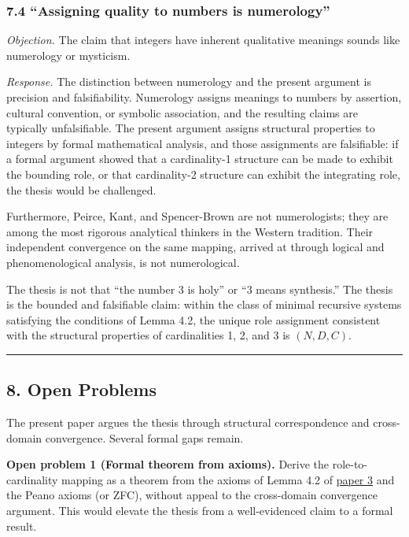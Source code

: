 \documentclass[
  11pt,
  letterpaper,
]{article}
\begin{document}
\subsubsection{7.4 ``Assigning quality to numbers is
numerology''}\label{assigning-quality-to-numbers-is-numerology}

\emph{Objection.} The claim that integers have inherent qualitative
meanings sounds like numerology or mysticism.

\emph{Response.} The distinction between numerology and the present
argument is precision and falsifiability. Numerology assigns meanings to
numbers by assertion, cultural convention, or symbolic association, and
the resulting claims are typically unfalsifiable. The present argument
assigns structural properties to integers by formal mathematical
analysis, and those assignments are falsifiable: if a formal argument
showed that a cardinality-1 structure can be made to exhibit the
bounding role, or that cardinality-2 structure can exhibit the
integrating role, the thesis would be challenged.

Furthermore, Peirce, Kant, and Spencer-Brown are not numerologists; they
are among the most rigorous analytical thinkers in the Western
tradition. Their independent convergence on the same mapping, arrived at
through logical and phenomenological analysis, is not numerological.

The thesis is not that ``the number 3 is holy'' or ``3 means
synthesis.'' The thesis is the bounded and falsifiable claim: within the
class of minimal recursive systems satisfying the conditions of Lemma
4.2, the unique role assignment consistent with the structural
properties of cardinalities 1, 2, and 3 is \((N, D, C)\).

\begin{center}\rule{0.5\linewidth}{0.5pt}\end{center}

\subsection{8. Open Problems}\label{open-problems}

The present paper argues the thesis through structural correspondence
and cross-domain convergence. Several formal gaps remain.

\textbf{Open problem 1 (Formal theorem from axioms).} Derive the
role-to-cardinality mapping as a theorem from the axioms of Lemma 4.2 of
\href{https://github.com/baardev/truevalue/blob/main/docnav/Research/papers/3_minimal-recursive-triadic-framework/3_minimal-recursive-triadic-framework.pdf}{paper
3} and the Peano axioms (or ZFC), without appeal to the cross-domain
convergence argument. This would elevate the thesis from a
well-evidenced claim to a formal result.
\end{document}
